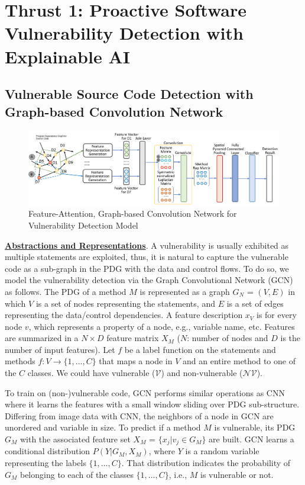 \section{Thrust 1: Proactive Software Vulnerability Detection with Explainable AI}
\label{sec:thrust1}

\subsection{Vulnerable Source Code Detection with Graph-based Convolution Network} \label{sec:vd}

\begin{figure}[!hbt]
    \centering
    \includegraphics[width=6.5in]{graph-based-CNN.png}
    \caption{Feature-Attention, Graph-based Convolution Network for
      Vulnerability Detection Model}
    \label{fig:detection-model}
\end{figure}


\noindent \underline{\bf Abstractions and Representations}. A vulnerability is usually
exhibited as multiple statements are exploited, thus, it is natural to
capture the vulnerable code as a sub-graph in the PDG with the data
and control flows. To do so, we model the vulnerability
detection via the Graph Convolutional Network (GCN)~\cite{GCN16} as
follows. The PDG of a method $M$ is represented as a graph $G_N$ =
$(V,E)$ in which $V$ is a set of nodes representing the statements,
and $E$ is a set of edges representing the data/control dependencies.
%
A feature description $x_V$ is for every node $v$, which represents a
property of a node, e.g., variable name, etc. Features are summarized
in a $N \times D$ feature matrix $X_M$ ($N$: number of nodes and $D$
is the number of input features).
%
Let $f$ be a label function on the statements and methods $f: V
\rightarrow \{1,...,C\}$ that maps a node in $V$ and an entire method
to one of the $C$ classes. We could have vulnerable
($\mathcal{V}$) and non-vulnerable ($\mathcal{NV}$).


To train on (non-)vulnerable code, GCN
performs similar operations as CNN where it learns the features with a
small window sliding over PDG sub-structure. Differing from
image data with CNN, the neighbors of a node in GCN are unordered and
variable in size. To predict if a method $M$ is vulnerable, its PDG
$G_M$ with the associated feature set $X_M$ = $\{x_j|v_j \in G_M\}$
are built. GCN learns a conditional distribution $P(Y|G_M,X_M)$, where
$Y$ is a random variable representing the labels $\{1,...,C\}$. That
distribution indicates the probability of $G_M$ belonging to
each of the classes $\{1,...,C\}$, i.e., $M$ is vulnerable or not.

